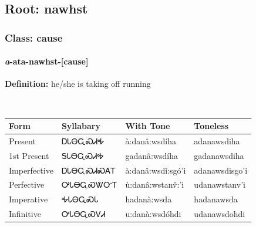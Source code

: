 \needspace{4in}
\subsection*{Root: nawhst}
\nopagebreak
{}
\needspace{3in}
\subsubsection*{Class: cause}
\nopagebreak
\needspace{2in}
\paragraph*{\textit{a}{-}ata{-}\textbf{nawhst}{-}[cause]}
\nopagebreak
\textbf{Definition: } he/she is taking off running
\\[0.5em]
\begin{tabularx}{\textwidth}{l X X X}%
\toprule%
\textbf{Form}&\textbf{Syllabary}&\textbf{With Tone}&\textbf{Toneless}\\%
\midrule%
Present&ᎠᏓᎾᏩᏍᏗᎭ&à:danâ:wsdíha&adanawsdiha\\%
1st Present&ᎦᏓᎾᏩᏍᏗᎭ&gadanâ:wsdíha&gadanawsdiha\\%
Imperfective&ᎠᏓᎾᏩᏍᏗᏍᎪᎢ&à:danâ:wsdǐ:sgó’i&adanawsdisgo’i\\%
Perfective&ᎤᏓᎾᏩᏍᏔᏅᎢ&ù:danâ:wstanv̌:’i&udanawstanv’i\\%
Imperative&ᎭᏓᎾᏩᏍᏓ&hadanà:wsda&hadanawsda\\%
Infinitive&ᎤᏓᎾᏩᏍᏙᏗ&u:danà:wsdóhdi&udanawsdohdi\\%
\bottomrule%
\end{tabularx}
\\[1em]